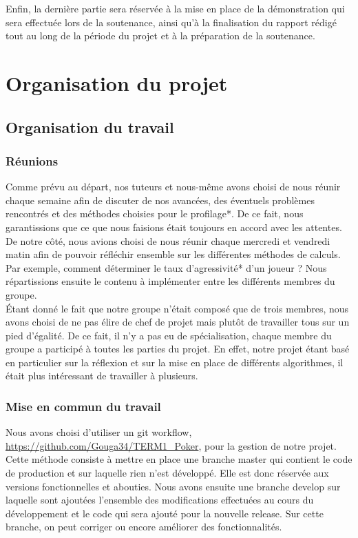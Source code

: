 \documentclass{report}
\begin{document}
Enfin, la dernière partie sera réservée à la mise en place de la démonstration qui sera effectuée lors de la soutenance, ainsi qu'à la finalisation du rapport rédigé tout au long de la période du projet et à la préparation de la soutenance.\par

\chapter{Organisation du projet}



\section{Organisation du travail}

\subsection{Réunions}
\hspace{0.5cm}Comme prévu au départ, nos tuteurs et nous-même avons choisi de nous réunir chaque semaine afin de discuter de nos avancées, des éventuels problèmes rencontrés et des méthodes choisies pour le profilage*. De ce fait, nous garantissions que ce que nous faisions était toujours en accord avec les attentes.\\

De notre côté, nous avions choisi de nous réunir chaque mercredi et vendredi matin afin de pouvoir réfléchir ensemble sur les différentes méthodes de calculs. Par exemple, comment déterminer le taux d'agressivité* d'un joueur ? Nous répartissions ensuite le contenu à implémenter entre les différents membres du groupe.\\

Étant donné le fait que notre groupe n'était composé que de trois membres, nous avons choisi de ne pas élire de chef de projet mais plutôt de travailler tous sur un pied d'égalité. De ce fait, il n'y a pas eu de spécialisation, chaque membre du groupe a participé à toutes les parties du projet. En effet, notre projet étant basé en particulier sur la réflexion et sur la mise en place de différents algorithmes, il était plus intéressant de travailler à plusieurs.\par

\subsection{Mise en commun du travail}
\hspace{0.5cm}Nous avons choisi d'utiliser un git workflow, \url{https://github.com/Gouga34/TERM1_Poker}, pour la gestion de notre projet. Cette méthode consiste à mettre en place une branche master qui contient le code de production et sur laquelle rien n'est développé. Elle est donc réservée aux versions fonctionnelles et abouties.
Nous avons ensuite une branche develop sur laquelle sont ajoutées l'ensemble des modifications effectuées au cours du développement et le code qui sera ajouté pour la nouvelle release. Sur cette branche, on peut corriger ou encore améliorer des fonctionnalités. \\
\end{document}
